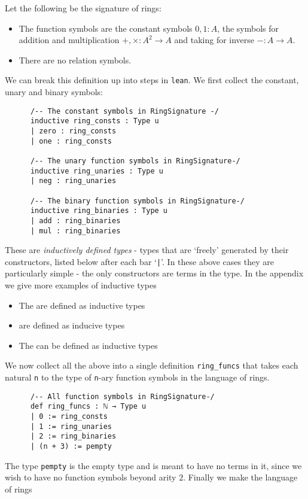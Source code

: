 \begin{dfn}
    Let the following be the signature of rings:
    \begin{itemize}
        \item The function symbols are the constant symbols $0, 1 : A$,
        the symbols for addition and multiplication $+ , \times : A^2 \to A$
        and taking for inverse $- : A \to A$.
        \item There are no relation symbols.
    \end{itemize}

    We can break this definition up into steps in \texttt{lean}.
    We first collect the constant, unary and binary symbols:

    \begin{lstlisting}
      /-- The constant symbols in RingSignature -/
      inductive ring_consts : Type u
      | zero : ring_consts
      | one : ring_consts

      /-- The unary function symbols in RingSignature-/
      inductive ring_unaries : Type u
      | neg : ring_unaries

      /-- The binary function symbols in RingSignature-/
      inductive ring_binaries : Type u
      | add : ring_binaries
      | mul : ring_binaries\end{lstlisting}

    These are \textit{inductively defined types} -
    types that are `freely' generated by their constructors,
    listed below after each bar `\texttt{|}'.
    In these above cases they are particularly simple -
    the only constructors are terms in the type.
    In the appendix we give more examples of inductive types
    \begin{itemize}
      \item The  are defined as inductive types
      \item {} are defined as inducive types
      \item The  can be defined as inductive types
    \end{itemize}

    We now collect all the above into a single definition \texttt{ring_funcs}
    that takes each natural \texttt{n} to the type of \texttt{n}-ary
    function symbols in the language of rings.
    \begin{lstlisting}
      /-- All function symbols in RingSignature-/
      def ring_funcs : ℕ → Type u
      | 0 := ring_consts
      | 1 := ring_unaries
      | 2 := ring_binaries
      | (n + 3) := pempty\end{lstlisting}
    The type \texttt{pempty} is the empty type and is meant to have no terms in it,
    since we wish to have no function symbols beyond arity $2$.
    Finally we make the language of rings


\end{dfn}
